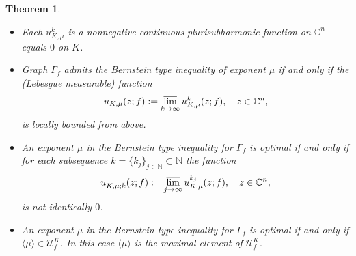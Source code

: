 \documentclass[11pt, oneside]{amsart}
\newtheorem{Th}{Theorem}[section]
\begin{document}
\begin{Th}\label{theo1.3}
\begin{itemize}
\item[(a)] Each $u_{K,\mu}^k$ is a nonnegative continuous plurisubharmonic function on $\mathbb C^n$ equals $0$ on $K$.
\item[(b)]
Graph $\Gamma_f$ admits the Bernstein type inequality of exponent $\mu$ if and only if the (Lebesgue measurable) function
\[
\begin{array}{r}
\displaystyle
u_{K,\mu}(z;f):=\varlimsup_{k\rightarrow\infty}u_{K,\mu}^k(z;f),\quad   z\in\mathbb C^n,
 \end{array}
\]
is locally bounded from above. 
\item[(c)]
An exponent $\mu$ in the Bernstein type inequality for $\Gamma_f$ is optimal if and only if for each subsequence $\bar k=\{k_j\}_{j\in\mathbb N}\subset\mathbb N$ the function
\[
\begin{array}{r}
\displaystyle
u_{K,\mu;\bar k}(z;f):=\varlimsup_{j\rightarrow\infty}u_{K,\mu}^{k_j}(z;f),\quad  z\in\mathbb C^n,
 \end{array}
\]
is not identically $0$. 
\item[(d)] 
An exponent $\mu$ in the Bernstein type inequality for $\Gamma_f$ is optimal if and only if $\langle\mu\rangle\in \mathscr U_f^K$.  In this case $\langle\mu\rangle$ is the maximal element of $\mathscr U_f^K$.
\end{itemize}
\end{Th}
\end{document}
